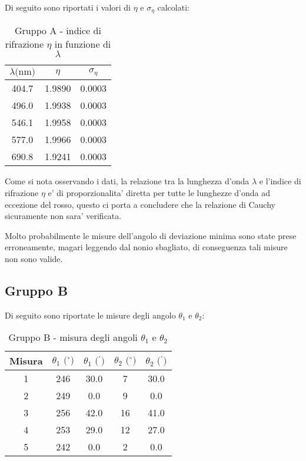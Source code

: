 Di seguito sono riportati i valori di $\eta$ e $\sigma_{\eta}$ calcolati:
\begin{table}[!htbp]
    {\par\centering
    \begin{tabular}{ccc}
        \hline
        $\lambda \text{(nm)}$ & 
        $\eta$ & 
        $\sigma_{\eta}$ \\
        \hline
        404.7   &   1.9890 &   0.0003 \\
        496.0   &   1.9938 &   0.0003 \\
        546.1   &   1.9958 &   0.0003 \\
        577.0   &   1.9966 &   0.0003 \\
        690.8   &   1.9241 &   0.0003 \\
        \hline
    \end{tabular}
    \par}
    \caption{Gruppo A - indice di rifrazione $\eta$ in funzione di $\lambda$}
\end{table}

Come si nota osservando i dati, la relazione tra la lunghezza d'onda $\lambda$ e l'indice di rifrazione $\eta$ e' di proporzionalita' diretta per tutte le lunghezze d'onda ad eccezione del rosso, questo ci porta a concludere che la relazione di Cauchy sicuramente non sara' verificata.

Molto probabilmente le misure dell'angolo di deviazione minima sono state prese erroneamente, magari leggendo dal nonio sbagliato, di conseguenza tali misure non sono valide.

\subsection{Gruppo B}
Di seguito sono riportate le misure degli angolo $\theta_1$ e $\theta_2$:
\begin{table}[!htbp]
    {\par\centering
    \begin{tabular}{ccccc}
        \hline
        Misura & $\theta_1 \text{ ($^{\circ}$)}$ & $\theta_1 \text{ ($^{\prime}$)}$ & $\theta_2 \text{ ($^{\circ}$)}$ & $\theta_2 \text{ ($^{\prime}$)}$ \\
        \hline
        1   &   246 &   30.0    &   7 &   30.0\\
        2   &   249 &   0.0    &   9 &   0.0\\
        3   &   256 &   42.0    &   16 &   41.0\\
        4   &   253 &   29.0    &   12 &   27.0\\
        5   &   242 &   0.0 &   2 &   0.0\\
        \hline
    \end{tabular}
    \par}
    \caption{Gruppo B - misura degli angoli $\theta_1$ e $\theta_2$}
\end{table}

